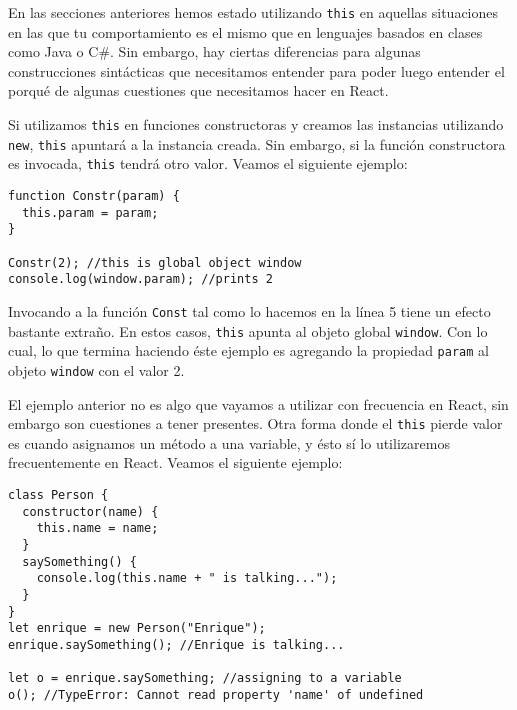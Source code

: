 \documentclass[a4paper, oneside, titlepage, 12pt]{paper}
\begin{document}
En las secciones anteriores hemos estado utilizando \texttt{this} en aquellas situaciones en las que tu comportamiento es el mismo que en lenguajes basados en clases como Java o C\#. Sin embargo, hay ciertas diferencias para algunas construcciones sintácticas que necesitamos entender para poder luego entender el porqué de algunas cuestiones que necesitamos hacer en React.
\newline

Si utilizamos \texttt{this} en funciones constructoras y creamos las instancias utilizando \texttt{new}, \texttt{this} apuntará a la instancia creada. Sin embargo, si la función constructora es invocada, \texttt{this} tendrá otro valor. Veamos el siguiente ejemplo:

\begin{verbatim}
function Constr(param) {
  this.param = param;
}

Constr(2); //this is global object window
console.log(window.param); //prints 2
\end{verbatim}

Invocando a la función \texttt{Const} tal como lo hacemos en la línea 5 tiene un efecto bastante extraño. En estos casos, \texttt{this} apunta al objeto global \texttt{window}. Con lo cual, lo que termina haciendo éste ejemplo es agregando la propiedad \texttt{param} al objeto \texttt{window} con el valor 2.
\newline

El ejemplo anterior no es algo que vayamos a utilizar con frecuencia en React, sin embargo son cuestiones a tener presentes. Otra forma donde el \texttt{this} pierde valor es cuando asignamos un método a una variable, y ésto sí lo utilizaremos frecuentemente en React. Veamos el siguiente ejemplo:

\begin{verbatim}
class Person {
  constructor(name) {
    this.name = name;
  }
  saySomething() {
    console.log(this.name + " is talking...");
  }
}
let enrique = new Person("Enrique");
enrique.saySomething(); //Enrique is talking...

let o = enrique.saySomething; //assigning to a variable
o(); //TypeError: Cannot read property 'name' of undefined
\end{verbatim}
\end{document}
